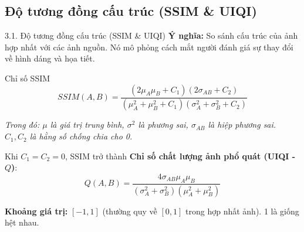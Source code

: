 \documentclass{beamer}
\begin{document}
\subsection{Độ tương đồng cấu trúc (SSIM \& UIQI)}

\begin{frame}{3.1. Độ tương đồng cấu trúc (SSIM \& UIQI)}
    \textbf{Ý nghĩa:} So sánh cấu trúc của ảnh hợp nhất với các ảnh nguồn. Nó mô phỏng cách mắt người đánh giá sự thay đổi về hình dáng và họa tiết.

    \begin{block}{Chỉ số SSIM}
    \begin{equation}
        SSIM(A,B) = \frac{(2\mu_A\mu_B + C_1)(2\sigma_{AB} + C_2)}{(\mu_A^2 + \mu_B^2 + C_1)(\sigma_A^2 + \sigma_B^2 + C_2)}
    \end{equation}
    \end{block}
    \textit{Trong đó: $\mu$ là giá trị trung bình, $\sigma^2$ là phương sai, $\sigma_{AB}$ là hiệp phương sai. $C_1, C_2$ là hằng số chống chia cho 0.}

    \vspace{0.3cm}
    Khi $C_1 = C_2 = 0$, SSIM trở thành \textbf{Chỉ số chất lượng ảnh phổ quát (UIQI - $Q$)}:
    \begin{equation}
        Q(A,B) = \frac{4\sigma_{AB}\mu_A\mu_B}{(\sigma_A^2 + \sigma_B^2)(\mu_A^2 + \mu_B^2)}
    \end{equation}

    \vspace{0.2cm}
    \textbf{Khoảng giá trị:} $[-1, 1]$ (thường quy về $[0, 1]$ trong hợp nhất ảnh). 1 là giống hệt nhau.
\end{frame}
\end{document}
